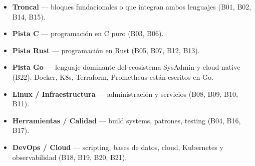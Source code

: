 \documentclass[11pt, letterpaper]{article}
\begin{document}
\begin{itemize}[leftmargin=2cm]
  \item[\colorbox{tTrack}{\makebox[1.5cm]{}}]
    \textbf{Troncal} --- bloques fundacionales o que integran ambos
    lenguajes (B01, B02, B14, B15).
  \item[\colorbox{cTrack}{\makebox[1.5cm]{}}]
    \textbf{Pista C} --- programación en C puro (B03, B06).
  \item[\colorbox{rTrack}{\makebox[1.5cm]{}}]
    \textbf{Pista Rust} --- programación en Rust (B05, B07, B12, B13).
  \item[\colorbox{goTrack}{\makebox[1.5cm]{}}]
    \textbf{Pista Go} --- lenguaje dominante del ecosistema SysAdmin y
    cloud-native (B22). Docker, K8s, Terraform, Prometheus están
    escritos en Go.
  \item[\colorbox{lTrack}{\makebox[1.5cm]{}}]
    \textbf{Linux / Infraestructura} --- administración y servicios
    (B08, B09, B10, B11).
  \item[\colorbox{qTrack}{\makebox[1.5cm]{}}]
    \textbf{Herramientas / Calidad} --- build systems, patrones,
    testing (B04, B16, B17).
  \item[\colorbox{dTrack}{\makebox[1.5cm]{}}]
    \textbf{DevOps / Cloud} --- scripting, bases de datos, cloud,
    Kubernetes y observabilidad (B18, B19, B20, B21).
\end{itemize}
\end{document}
